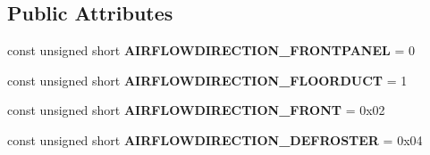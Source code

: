 \subsection*{Public Attributes}
\begin{DoxyCompactItemize}
\item 
\hypertarget{interfaceVehicle_1_1HVAC_a1c7837fc482d8fcf8174dd15938c0795}{const unsigned short {\bfseries A\-I\-R\-F\-L\-O\-W\-D\-I\-R\-E\-C\-T\-I\-O\-N\-\_\-\-F\-R\-O\-N\-T\-P\-A\-N\-E\-L} = 0}\label{interfaceVehicle_1_1HVAC_a1c7837fc482d8fcf8174dd15938c0795}

\item 
\hypertarget{interfaceVehicle_1_1HVAC_ac6d6f5292bccf52b402d8f1b26ba0edc}{const unsigned short {\bfseries A\-I\-R\-F\-L\-O\-W\-D\-I\-R\-E\-C\-T\-I\-O\-N\-\_\-\-F\-L\-O\-O\-R\-D\-U\-C\-T} = 1}\label{interfaceVehicle_1_1HVAC_ac6d6f5292bccf52b402d8f1b26ba0edc}

\item 
\hypertarget{interfaceVehicle_1_1HVAC_ac7ff422df637a164553dfbf766c2945b}{const unsigned short {\bfseries A\-I\-R\-F\-L\-O\-W\-D\-I\-R\-E\-C\-T\-I\-O\-N\-\_\-\-F\-R\-O\-N\-T} = 0x02}\label{interfaceVehicle_1_1HVAC_ac7ff422df637a164553dfbf766c2945b}

\item 
\hypertarget{interfaceVehicle_1_1HVAC_a3aaecf490c73ce71bb990f40a5b7c4ef}{const unsigned short {\bfseries A\-I\-R\-F\-L\-O\-W\-D\-I\-R\-E\-C\-T\-I\-O\-N\-\_\-\-D\-E\-F\-R\-O\-S\-T\-E\-R} = 0x04}\label{interfaceVehicle_1_1HVAC_a3aaecf490c73ce71bb990f40a5b7c4ef}


\end{DoxyCompactItemize}
